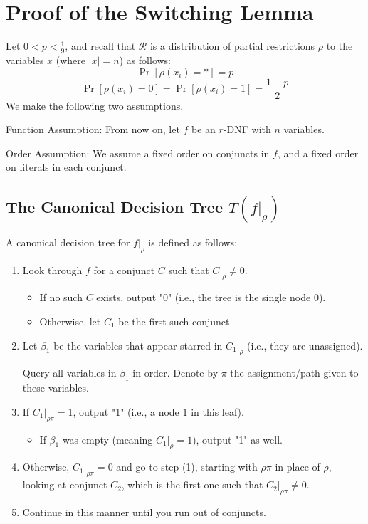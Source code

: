 \section{Proof of the Switching Lemma}

Let \( 0 < p < \frac{1}{9} \), and recall that  \(\mathcal{R}\) is a distribution of partial restrictions
\(\rho\) to the variables \( \bar{x} \) (where \( |\bar{x}| = n \)) as follows:
\[
\Pr[\rho(x_i) = *] = p
\]
\[
\Pr[\rho(x_i) = 0] = \Pr[\rho(x_i) = 1] = \frac{1 - p}{2}
\]
We make the following two assumptions.

Function Assumption: From now on, let \( f \) be an $r$-DNF with \( n \) variables.

Order Assumption:  We assume a fixed order on conjuncts in \( f \),
and a fixed order on literals in each conjunct.

\subsection{The Canonical Decision Tree \( T(f|_{\rho}) \)}

A canonical decision tree for \( f|_{\rho} \) is defined as follows:

\begin{enumerate}
    \item Look through \( f \) for a conjunct \( C \) such that \( C|_{\rho} \neq 0 \).
    \begin{itemize}
        \item If no such \( C \) exists, output "0" (i.e., the tree is the single node \( 0 \)).
        \item Otherwise, let \( C_1 \) be the first such conjunct.
    \end{itemize}
    
    \item Let \( \beta_1 \) be the variables that appear starred in \( C_1|_{\rho} \) (i.e., they are unassigned).
    
    Query all variables in \( \beta_1 \) in order. Denote by \( \pi \) the assignment/path given to these variables.
    
    \item If \( C_1|_{\rho\pi} = 1 \), output "1" (i.e., a node \( 1 \) in this leaf).
    \begin{itemize}
        \item If \( \beta_1 \) was empty (meaning \( C_1|_{\rho} = 1 \)), output "1" as well.
    \end{itemize}
    
    \item Otherwise, \( C_1|_{\rho\pi} = 0 \) and go to step (1), starting with \( \rho\pi \) in place of \( \rho \), looking at conjunct \( C_2 \), which is the first one such that \( C_2|_{\rho\pi} \neq 0 \).
    
    \item Continue in this manner until you run out of conjuncts.
\end{enumerate}

